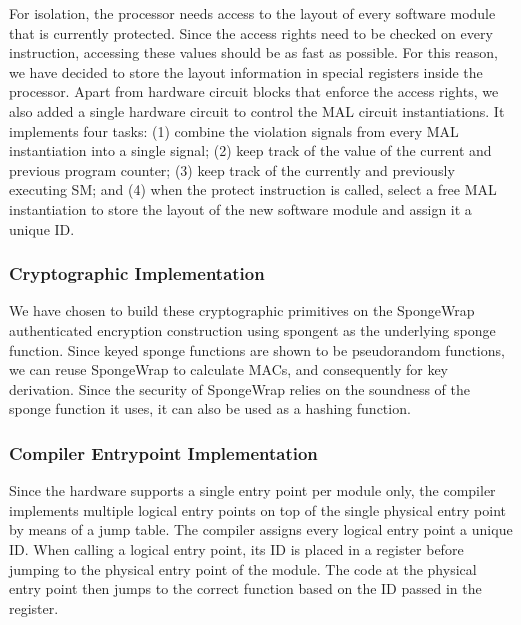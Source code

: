 \documentclass{article}
\begin{document}
For isolation, the processor needs access to the layout of every software module that is currently protected. Since the access rights need to be checked on every instruction, accessing these values should be as fast as possible. For this reason, we have decided to store the layout information in special registers inside the processor. Apart from hardware circuit blocks that enforce the access rights, we also added a single hardware circuit to control the MAL circuit instantiations. It implements four tasks: (1) combine the violation signals from every MAL instantiation into a single signal; (2) keep track of the value of the current and previous program counter; (3) keep track of the currently and previously executing SM; and (4) when the protect instruction is called, select a free MAL instantiation to store the layout of the new software module and assign it a unique ID.

\subsubsection{Cryptographic Implementation}

We have chosen to build these cryptographic primitives on the SpongeWrap authenticated encryption construction using spongent as the underlying sponge function. Since keyed sponge functions are shown to be pseudorandom functions, we can reuse SpongeWrap to calculate MACs, and consequently for key derivation. Since the security of SpongeWrap relies on the soundness of the sponge function it uses, it can also be used as a hashing function.

\subsubsection{Compiler Entrypoint Implementation}

Since the hardware supports a single entry point per module only, the compiler implements multiple logical entry points on top of the single physical entry point by means of a jump table. The compiler assigns every logical entry point a unique ID. When calling a logical entry point, its ID is placed in a register before jumping to the physical entry point of the module. The code at the physical entry point then jumps to the correct function based on the ID passed in the register.
\end{document}
